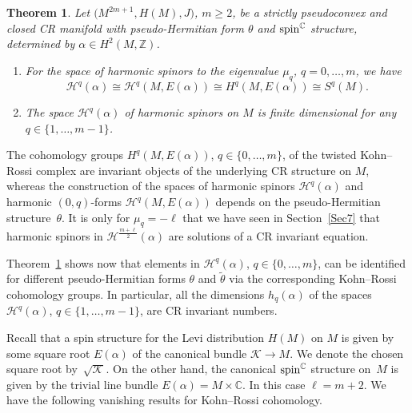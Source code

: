 \documentclass[pdftex]{sigma}
\numberwithin{equation}{section}
\newtheorem{Theorem}{Theorem}[section]
\newcommand{\ZZ}{\mathbb{Z}}
\newcommand{\CC}{\mathbb{C}}
\begin{document}
\begin{Theorem} \label{SKR} Let $\big(M^{2m+1}, H(M),J\big)$, $m\geq 2$, be a strictly pseudoconvex and closed CR manifold
with pseudo-Hermitian form $\theta$ and ${\rm spin}^\CC$ structure, determined by $\alpha\in H^2(M,\ZZ)$.
\begin{enumerate}\itemsep=0pt
\item[$1.$] For the space of harmonic spinors to the eigenvalue $\mu_q$, $q=0,\dots,m$, we have
\[
\mathcal{H}^q(\alpha) \cong \mathcal{H}^q(M,E(\alpha)) \cong H^q(M,E(\alpha)) \cong S^q(M).\]
\item[$2.$] The space $\mathcal{H}^q(\alpha)$ of harmonic spinors
on $M$ is finite dimensional for any $q\in\{1,\dots,m-1\}$.
\end{enumerate}
\end{Theorem}

\begin{Remark} The cohomology groups $H^q(M,E(\alpha))$, $q\in\{0,\dots,m\}$, of the twisted Kohn--Rossi complex are invariant objects of the underlying CR structure on $M$, whereas the construction of the spaces of harmonic spinors $\mathcal{H}^q(\alpha)$ and harmonic $(0,q)$-forms $\mathcal{H}^q(M,E(\alpha))$ depends on the pseudo-Hermitian structure~$\theta$. It is only for $\mu_q=-\ell$ that we have seen in Section~\ref{Sec7} that harmonic spinors in $\mathcal{H}^{\frac{m+\ell}{2}}(\alpha)$ are solutions of a CR invariant equation.

Theorem~\ref{SKR} shows now that elements
in $\mathcal{H}^q(\alpha)$, $q\in\{0,\dots,m\}$, can be identified for different pseudo-Hermitian forms $\theta$ and $\tilde{\theta}$ via the corresponding
Kohn--Rossi cohomology groups. In particular, all the dimensions $h_q(\alpha)$ of the spaces $\mathcal{H}^q(\alpha)$, $q\in\{1,\dots,m-1\}$, are CR invariant numbers.
\end{Remark}

Recall that a spin structure for the Levi distribution $H(M)$ on $M$ is given by some square root $E(\alpha)$
of the canonical bundle $\mathcal{K}\to M$. We denote the chosen square root by~$\sqrt{\mathcal{K}}$.
On the other hand, the canonical ${\rm spin}^\CC$ structure on~$M$ is given by the trivial line bundle $E(\alpha)=M\times\CC$.
In this case $\ell=m+2$. We have the following vanishing results for Kohn--Rossi cohomology.
\end{document}
